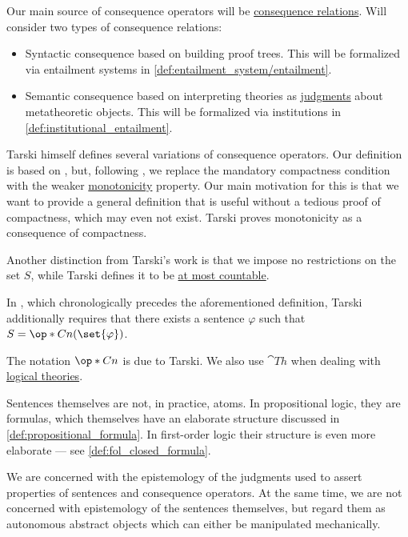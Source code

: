 \begin{comments}
  \item Our main source of consequence operators will be \hyperref[def:consequence_relation]{consequence relations}. Will consider two types of consequence relations:
  \begin{itemize}
    \item Syntactic consequence based on building proof trees. This will be formalized via entailment systems in \cref{def:entailment_system/entailment}.
    \item Semantic consequence based on interpreting theories as \hyperref[con:judgment]{judgments} about metatheoretic objects. This will be formalized via institutions in \cref{def:institutional_entailment}.
  \end{itemize}

  \item Tarski himself defines several variations of consequence operators. Our definition is based on \cite[64]{Tarski1983Collection:MethodologyOfDeductiveSciences}, but, following \cite[\S 4.2.1]{CitkinMuravitsky2022ConsequenceRelations}, we replace the mandatory compactness condition with the weaker \hyperref[def:order_function/preserving]{monotonicity} property. Our main motivation for this is that we want to provide a general definition that is useful without a tedious proof of compactness, which may even not exist. Tarski proves monotonicity as a consequence of compactness.

  Another distinction from Tarski's work is that we impose no restrictions on the set \( S \), while Tarski defines it to be \hyperref[def:aleph_zero_related_cardinalities]{at most countable}.

  In \cite[31]{Tarski1983Collection:FundamentalConceptsOfMetamathematics}, which chronologically precedes the aforementioned definition, Tarski additionally requires that there exists a sentence \( \varphi \) such that \( S = \op*{Cn}(\set{ \varphi }) \).

  \item The notation \( \op*{Cn} \) is due to Tarski. We also use \( \cat{Th} \) when dealing with \hyperref[def:logical_theory]{logical theories}.

  \item Sentences themselves are not, in practice, atoms. In propositional logic, they are formulas, which themselves have an elaborate structure discussed in \cref{def:propositional_formula}. In first-order logic their structure is even more elaborate --- see \cref{def:fol_closed_formula}.

  \item We are concerned with the epistemology of the judgments used to assert properties of sentences and consequence operators. At the same time, we are not concerned with epistemology of the sentences themselves, but regard them as autonomous abstract objects which can either be manipulated mechanically.
\end{comments}

